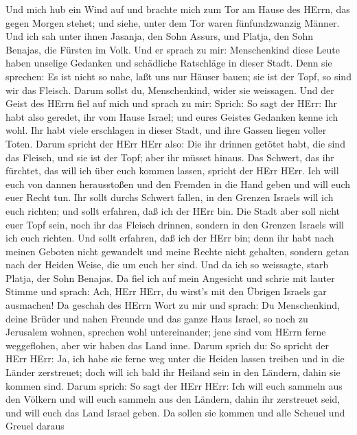  Und mich hub ein Wind auf und brachte mich zum Tor am Hause
des HErrn, das gegen Morgen stehet; und siehe, unter dem Tor waren
fünfundzwanzig Männer. Und ich sah unter ihnen Jasanja, den Sohn Assurs,
und Platja, den Sohn Benajas, die Fürsten im Volk.  Und er
sprach zu mir: Menschenkind diese Leute haben unselige Gedanken und
schädliche Ratschläge in dieser Stadt.  Denn sie sprechen:
Es ist nicht so nahe, laßt uns nur Häuser bauen; sie ist der Topf, so
sind wir das Fleisch.  Darum sollst du, Menschenkind, wider
sie weissagen.  Und der Geist des HErrn fiel auf mich und
sprach zu mir: Sprich: So sagt der HErr: Ihr habt also geredet, ihr vom
Hause Israel; und eures Geistes Gedanken kenne ich wohl. 
Ihr habt viele erschlagen in dieser Stadt, und ihre Gassen liegen voller
Toten.  Darum spricht der HErr HErr also: Die ihr drinnen
getötet habt, die sind das Fleisch, und sie ist der Topf; aber ihr
müsset hinaus.  Das Schwert, das ihr fürchtet, das will ich
über euch kommen lassen, spricht der HErr HErr.  Ich will
euch von dannen herausstoßen und den Fremden in die Hand geben und will
euch euer Recht tun.  Ihr sollt durchs Schwert fallen, in
den Grenzen Israels will ich euch richten; und sollt erfahren, daß ich
der HErr bin.  Die Stadt aber soll nicht euer Topf sein,
noch ihr das Fleisch drinnen, sondern in den Grenzen Israels will ich
euch richten.  Und sollt erfahren, daß ich der HErr bin;
denn ihr habt nach meinen Geboten nicht gewandelt und meine Rechte nicht
gehalten, sondern getan nach der Heiden Weise, die um euch her sind.
 Und da ich so weissagte, starb Platja, der Sohn Benajas.
Da fiel ich auf mein Angesicht und schrie mit lauter Stimme und sprach:
Ach, HErr HErr, du wirst's mit den Übrigen Israels gar ausmachen!
 Da geschah des HErrn Wort zu mir und sprach: 
Du Menschenkind, deine Brüder und nahen Freunde und das ganze Haus
Israel, so noch zu Jerusalem wohnen, sprechen wohl untereinander; jene
sind vom HErrn ferne weggeflohen, aber wir haben das Land inne.
 Darum sprich du: So spricht der HErr HErr: Ja, ich habe
sie ferne weg unter die Heiden lassen treiben und in die Länder
zerstreuet; doch will ich bald ihr Heiland sein in den Ländern, dahin
sie kommen sind.  Darum sprich: So sagt der HErr HErr: Ich
will euch sammeln aus den Völkern und will euch sammeln aus den Ländern,
dahin ihr zerstreuet seid, und will euch das Land Israel geben.
 Da sollen sie kommen und alle Scheuel und Greuel daraus
